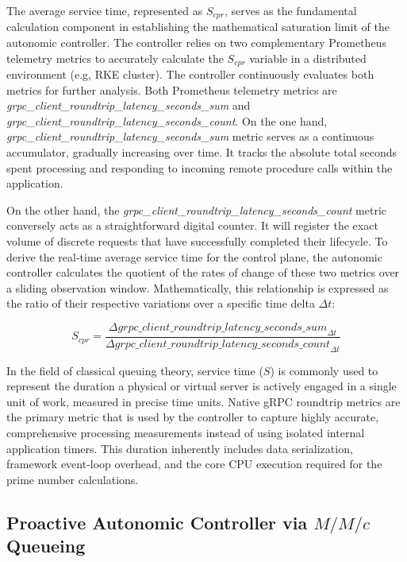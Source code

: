 \documentclass{ieeeaccess}
\begin{document}
The average service time, represented as $S_{cpr}$, serves as the fundamental calculation component in establishing the mathematical saturation limit of the autonomic controller. The controller relies on two complementary Prometheus telemetry metrics to accurately calculate the $S_{cpr}$ variable in a distributed environment (e.g, RKE cluster). The controller continuously evaluates both metrics for further analysis. Both Prometheus telemetry metrics are \textit{grpc\_client\_roundtrip\_latency\_seconds\_sum} and \textit{grpc\_client\_roundtrip\_latency\_seconds\_count}.
On the one hand, \textit{grpc\_client\_roundtrip\_latency\_seconds\_sum} metric serves as a continuous accumulator, gradually increasing over time. It tracks the absolute total seconds spent processing and responding to incoming remote procedure calls within the application.

On the other hand, the \textit{grpc\_client\_roundtrip\_latency\_\break seconds\_count} metric conversely acts as a straightforward digital counter. It will register the exact volume of discrete requests that have successfully completed their lifecycle. To derive the real-time average service time for the control plane, the autonomic controller calculates the quotient of the rates of change of these two metrics over a sliding observation window. Mathematically, this relationship is expressed as the ratio of their respective variations over a specific time delta $\Delta t$:

$$S_{cpr} = \frac{\Delta \textit{grpc\_client\_roundtrip\_latency\_seconds\_sum}_{\Delta t}}{\Delta \textit{grpc\_client\_roundtrip\_latency\_seconds\_count}_{\Delta t}}$$

In the field of classical queuing theory, service time ($S$) is commonly used to represent the duration a physical or virtual server is actively engaged in a single unit of work, measured in precise time units. Native gRPC roundtrip metrics are the primary metric that is used by the controller to capture highly accurate, comprehensive processing measurements instead of using isolated internal application timers. This duration inherently includes data serialization, framework event-loop overhead, and the core CPU execution required for the prime number calculations.    

\subsection{Proactive Autonomic Controller via $M/M/c$ Queueing}
\label{sec2.4}
\end{document}
